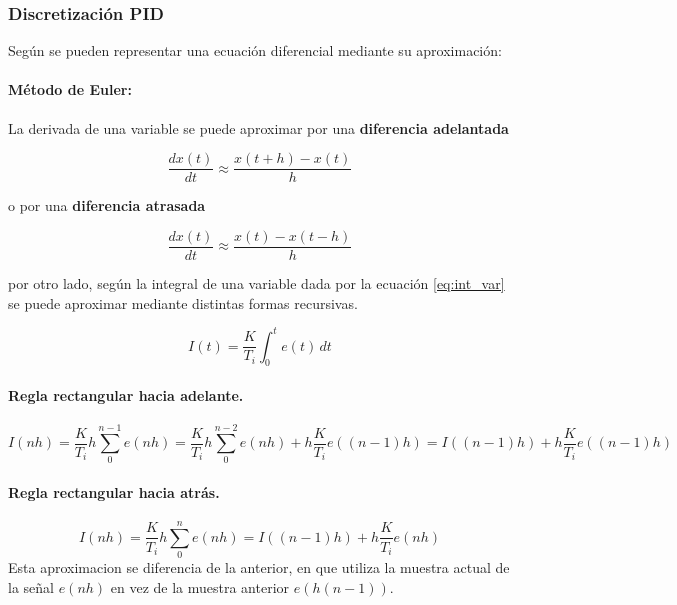 \documentclass[10pt,conference,a4paper,onecolumn]{article}%
\begin{document}
 
 \subsubsection{Discretización PID}
% 
 
 Según \cite[pág. 214]{astrom} se pueden representar una ecuación diferencial mediante su aproximación:
 
 \paragraph{Método de Euler:} La derivada de una variable se puede aproximar por una \textbf{diferencia adelantada}
 
 \begin{equation}
 \frac{dx(t)}{dt}\approx \frac{x(t+h)-x(t)}{h}
 \end{equation}
  
  o por  una \textbf{diferencia atrasada}
  
   \begin{equation}
 \frac{dx(t)}{dt}\approx \frac{x(t)-x(t-h)}{h}
 \end{equation}
  
  por otro lado, según \cite[pág. 46 ]{biblia_PID} la integral de una variable dada por la ecuación \ref{eq:int_var} se puede aproximar mediante  distintas formas recursivas.
  
\begin{equation}
I(t)=\frac{K}{T_i}\int_0^t e(t) \,dt
\label{eq:int_var}
\end{equation}  
  
  \paragraph{Regla rectangular hacia adelante.} 
  
  \begin{equation}
  I(nh)=\frac{K}{T_i}h \sum_0^{n-1}e(nh)= \frac{K}{T_i}h \sum_0^{n-2}e(nh) + h\frac{K}{T_i} e((n-1)h)=I((n-1)h)+  h\frac{K}{T_i} e((n-1)h)
  \end{equation}
  
  \paragraph{Regla rectangular hacia atrás.} 
  \begin{equation}
  I(nh)=\frac{K}{T_i}h \sum_0^{n}e(nh)=I((n-1)h)+  h\frac{K}{T_i} e(nh)
  \end{equation}
  Esta aproximacion se diferencia de la anterior, en que utiliza la muestra actual de la señal $e(nh)$ en vez de la muestra anterior $e(h(n-1))$.
  
\end{document}

